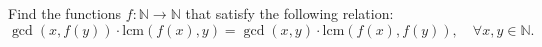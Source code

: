 Find the functions $ f:\mathbb{N}\longrightarrow\mathbb{N} $ that satisfy the following relation:
$$ \gcd\left( x,f(y)\right)\cdot\text{lcm}\left(f(x), y\right) = \gcd (x,y)\cdot\text{lcm}\left( f(x), f(y)\right) ,\quad\forall x,y\in\mathbb{N} . $$